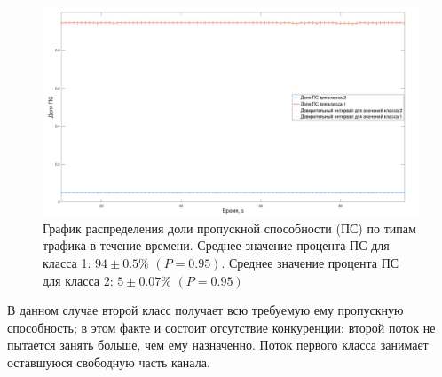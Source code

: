            \begin{figure}[ht!]
            	\center
            	\includegraphics[width=\linewidth]{./plotnc.png} %
            	\caption{График распределения доли пропускной способности (ПС) по типам трафика в течение времени.
						 Среднее значение процента  ПС для класса 1: $94 \pm 0.5 \%$ $(P = 0.95)$.
                         Среднее значение процента  ПС для класса 2: $5 \pm 0.07 \%$ $(P = 0.95)$}
    			\label{pic:plot2}
            \end{figure}

			В данном
			случае второй класс получает всю требуемую ему пропускную способность; в этом
			факте и состоит отсутствие конкуренции: второй поток не пытается занять больше,
			чем ему назначенно. Поток первого класса занимает оставшуюся свободную часть канала.
			
